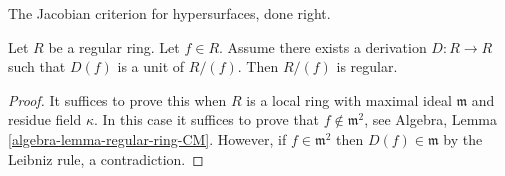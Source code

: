 \begin{lemma}
\label{lemma-quotient-regular}
\begin{slogan}
The Jacobian criterion for hypersurfaces, done right.
\end{slogan}
Let $R$ be a regular ring. Let $f \in R$. Assume there exists a
derivation $D : R \to R$ such that $D(f)$ is a unit of $R/(f)$.
Then $R/(f)$ is regular.
\end{lemma}

\begin{proof}
It suffices to prove this when $R$ is a local ring with maximal ideal
$\mathfrak m$ and residue field $\kappa$. In this case it suffices
to prove that $f \not \in \mathfrak m^2$, see
Algebra, Lemma \ref{algebra-lemma-regular-ring-CM}.
However, if $f \in \mathfrak m^2$ then $D(f) \in \mathfrak m$
by the Leibniz rule, a contradiction.
\end{proof}
